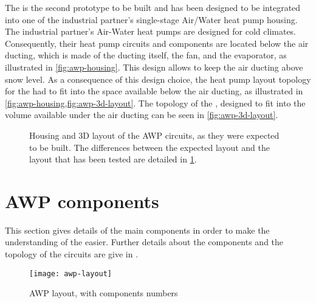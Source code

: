 The \AWP{} is the second prototype to be built and has been designed to be
integrated into one of the industrial partner's single-stage Air/Water
heat pump housing. The industrial partner's Air-Water heat pumps are
designed for cold climates. Consequently, their heat pump circuits and
components are located below the air ducting, which is made of the
ducting itself, the fan, and the evaporator, as illustrated in
\cref{fig:awp-housing}. This design allows to keep the air ducting
above snow level. As a consequence of this design choice, the heat
pump layout topology for the \AWP{} had to fit into the space
available below the air ducting, as illustrated in
\cref{fig:awp-housing,fig:awp-3d-layout}. The topology of the \AWP{},
designed to fit into the volume available under the air ducting can be
seen in \cref{fig:awp-3d-layout}.

\begin{figure}[htbp]
  \centering {}
  \caption[Housing and 3D layout of the AWP circuits]{Housing and 3D
    layout of the AWP circuits, as they were expected to be built. The
    differences between the expected layout and the layout that has
    been tested are detailed in \cref{sec:awp-main-components}.}
  \label{fig:awp-housing-and-3d}
\end{figure}

\section{AWP components}
\label{sec:awp-main-components}

This section gives details of the main components in order to
make the understanding of the
 easier. Further
details about the components and the topology of the circuits are give
in .

\begin{figure}[htbp]
  \centering
  \texttt{[image: awp-layout]}
  \caption[AWP layout with components numbers]
  {AWP layout, with components numbers}
  \label{fig:awp-layout-model-numbers}
\end{figure}

